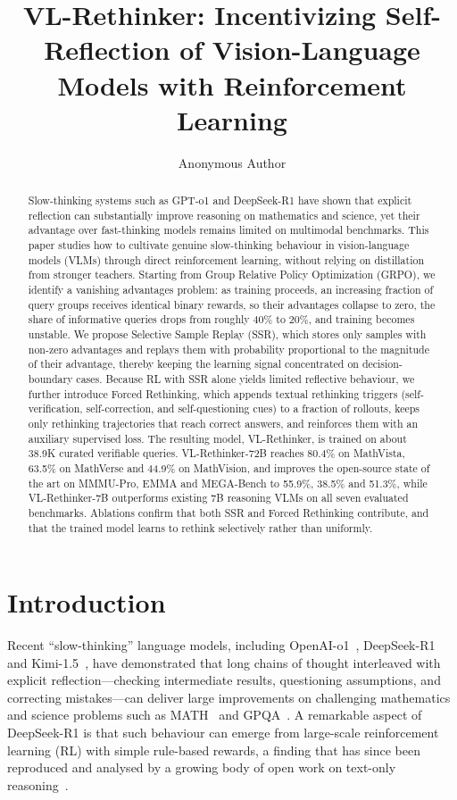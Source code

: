\documentclass{article}
\title{VL-Rethinker: Incentivizing Self-Reflection of Vision-Language Models with Reinforcement Learning}
\author{Anonymous Author}
\begin{document}
\maketitle

\begin{abstract}
Slow-thinking systems such as GPT-o1 and DeepSeek-R1 have shown that explicit reflection can substantially improve reasoning on mathematics and science, yet their advantage over fast-thinking models remains limited on multimodal benchmarks. This paper studies how to cultivate genuine slow-thinking behaviour in vision-language models (VLMs) through direct reinforcement learning, without relying on distillation from stronger teachers. Starting from Group Relative Policy Optimization (GRPO), we identify a vanishing advantages problem: as training proceeds, an increasing fraction of query groups receives identical binary rewards, so their advantages collapse to zero, the share of informative queries drops from roughly 40\% to 20\%, and training becomes unstable. We propose Selective Sample Replay (SSR), which stores only samples with non-zero advantages and replays them with probability proportional to the magnitude of their advantage, thereby keeping the learning signal concentrated on decision-boundary cases. Because RL with SSR alone yields limited reflective behaviour, we further introduce Forced Rethinking, which appends textual rethinking triggers (self-verification, self-correction, and self-questioning cues) to a fraction of rollouts, keeps only rethinking trajectories that reach correct answers, and reinforces them with an auxiliary supervised loss. The resulting model, VL-Rethinker, is trained on about 38.9K curated verifiable queries. VL-Rethinker-72B reaches 80.4\% on MathVista, 63.5\% on MathVerse and 44.9\% on MathVision, and improves the open-source state of the art on MMMU-Pro, EMMA and MEGA-Bench to 55.9\%, 38.5\% and 51.3\%, while VL-Rethinker-7B outperforms existing 7B reasoning VLMs on all seven evaluated benchmarks. Ablations confirm that both SSR and Forced Rethinking contribute, and that the trained model learns to rethink selectively rather than uniformly.
\end{abstract}

\section{Introduction}
\label{sec:intro}

Recent ``slow-thinking'' language models, including OpenAI-o1~\citep{openai-o1}, DeepSeek-R1~\citep{deepseek-r1} and Kimi-1.5~\citep{kimi-1_5}, have demonstrated that long chains of thought interleaved with explicit reflection---checking intermediate results, questioning assumptions, and correcting mistakes---can deliver large improvements on challenging mathematics and science problems such as MATH~\citep{math} and GPQA~\citep{gpqa}. A remarkable aspect of DeepSeek-R1 is that such behaviour can emerge from large-scale reinforcement learning (RL) with simple rule-based rewards, a finding that has since been reproduced and analysed by a growing body of open work on text-only reasoning~\citep{simplerl,open-reasoner-zero,deepscaler2025,dapo,drgrpo,lightr1}.
\end{document}
